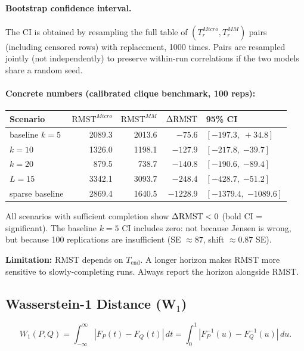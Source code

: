 \documentclass[11pt,a4paper]{article}
\begin{document}
\paragraph{Bootstrap confidence interval.}
The CI is obtained by resampling the full table of $(T_r^{Micro}, T_r^{MM})$
pairs (including censored rows) with replacement, 1000 times.  Pairs are
resampled jointly (not independently) to preserve within-run correlations if
the two models share a random seed.

\paragraph{Concrete numbers (calibrated clique benchmark, 100 reps):}
\begin{center}
\begin{tabular}{lrrrl}
\toprule
Scenario & $\mathrm{RMST}^{Micro}$ & $\mathrm{RMST}^{MM}$ & $\Delta\mathrm{RMST}$ & 95\% CI \\
\midrule
baseline $k=5$  & 2089.3 & 2013.6 & $-75.6$  & $[-197.3,\; +34.8]$ \\
$k=10$          & 1326.0 & 1198.1 & $-127.9$ & $[-217.8,\; \mathbf{-39.7}]$ \\
$k=20$          & 879.5  & 738.7  & $-140.8$ & $[-190.6,\; \mathbf{-89.4}]$ \\
$L=15$          & 3342.1 & 3093.7 & $-248.4$ & $[-428.7,\; \mathbf{-51.2}]$ \\
sparse baseline & 2869.4 & 1640.5 & $-1228.9$& $[-1379.4,\; \mathbf{-1089.6}]$ \\
\bottomrule
\end{tabular}
\end{center}
All scenarios with sufficient completion show $\Delta\mathrm{RMST} < 0$ (bold CI = significant).
The baseline $k=5$ CI includes zero: not because Jensen is wrong, but because
100 replications are insufficient (SE $\approx 87$, shift $\approx 0.87$ SE).

\textbf{Limitation:} RMST depends on $T_{\mathrm{end}}$.  A longer horizon
makes RMST more sensitive to slowly-completing runs.  Always report the
horizon alongside RMST.

\subsection{Wasserstein-1 Distance (W\texorpdfstring{$_1$}{1})}

\[
  W_1(P, Q) = \int_{-\infty}^{\infty} |F_P(t) - F_Q(t)|\, dt
            = \int_0^1 |F_P^{-1}(u) - F_Q^{-1}(u)|\, du.
\]
\end{document}
